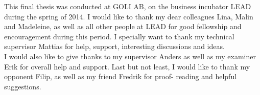This final thesis was conducted at GOLI AB, on the business incubator
LEAD during the spring of 2014. I would like to thank my dear colleagues
Lina, Malin and Madeleine, as well as all other people at LEAD for good
fellowship and encouragement during this period. I specially want to
thank my technical supervisor Mattias for help, support, interesting
discussions and ideas.\\

I would also like to give thanks to my supervisor Anders as well as my
examiner Erik for overall help and support. Last but not least, I would
like to thank my opponent Filip, as well as my friend Fredrik for proof-
reading and helpful suggestions.\\
